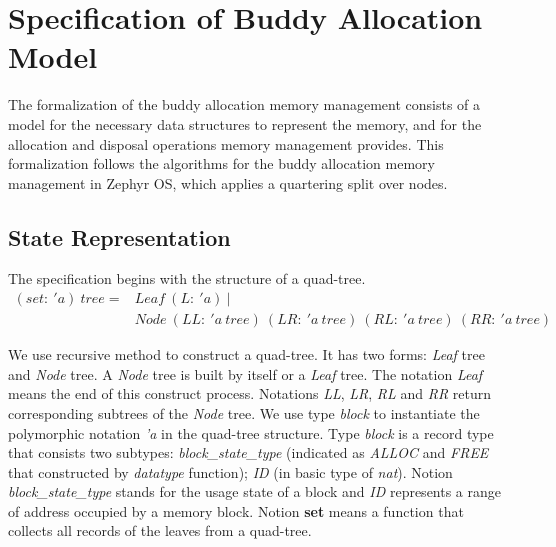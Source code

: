 \section{Specification of Buddy Allocation Model}
The formalization of the buddy allocation memory management consists of a model for the necessary data structures to represent the memory, and for the allocation and disposal operations memory management provides. This formalization follows the algorithms for the buddy allocation memory management in Zephyr OS, which applies a quartering split over nodes.


\subsection{State Representation}
The specification begins with the structure of a quad-tree.
\begin{align*}
(set:\ 'a)\ tree = &Leaf\ (L:\ 'a)\ | \\
&Node\ (LL:\ 'a\ tree)\ (LR:\ 'a\ tree)\ (RL:\ 'a\ tree)\ (RR:\ 'a\ tree)
\end{align*}

We use recursive method to construct a quad-tree. It has two forms: \emph{Leaf} tree and \emph{Node} tree. A \emph{Node} tree is built by itself or a \emph{Leaf} tree. The notation \emph{Leaf} means the end of this construct process. Notations \emph{LL}, \emph{LR}, \emph{RL} and \emph{RR} return corresponding subtrees of the \emph{Node} tree. We use type \emph{block} to instantiate the polymorphic notation \emph{'a} in the quad-tree structure. Type \emph{block} is a record type that consists two subtypes: \emph{block\_state\_type} (indicated as \emph{ALLOC} and \emph{FREE} that constructed by \emph{datatype} function); \emph{ID} (in basic type of \emph{nat}). Notion \emph{block\_state\_type} stands for the usage state of a block and \emph{ID} represents a range of address occupied by a memory block. Notion \textbf{set} means a function that collects all records of the leaves from a quad-tree.

